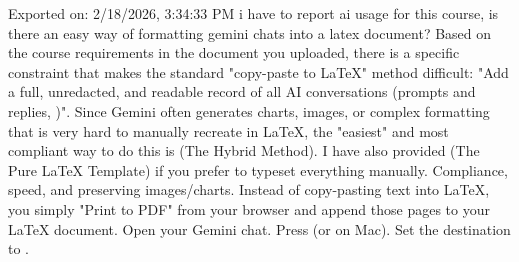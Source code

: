 \markdownRendererDocumentBegin
\markdownRendererSectionBegin
{}\markdownRendererInterblockSeparator
{}\markdownRendererBlockQuoteBegin
Exported on: 2/18/2026, 3:34:33 PM
\markdownRendererBlockQuoteEnd \markdownRendererInterblockSeparator
{}\markdownRendererThematicBreak{}\markdownRendererInterblockSeparator
{}\markdownRendererSectionBegin
{}\markdownRendererInterblockSeparator
{}i have to report ai usage for this course, is there an easy way of formatting gemini chats into a latex document?\markdownRendererInterblockSeparator
{}
\markdownRendererSectionEnd \markdownRendererSectionBegin
{}\markdownRendererInterblockSeparator
{}Based on the course requirements in the  document you uploaded, there is a specific constraint that makes the standard "copy-paste to LaTeX" method difficult:\markdownRendererInterblockSeparator
{}\markdownRendererBlockQuoteBegin
"Add a full, unredacted, and readable record of all AI conversations (prompts and replies, )\markdownRendererEllipsis{}".
\markdownRendererBlockQuoteEnd \markdownRendererInterblockSeparator
{}Since Gemini often generates charts, images, or complex formatting that is very hard to manually recreate in LaTeX, the "easiest" and most compliant way to do this is  (The Hybrid Method). I have also provided  (The Pure LaTeX Template) if you prefer to typeset everything manually.\markdownRendererInterblockSeparator
{}\markdownRendererSectionBegin
{}\markdownRendererInterblockSeparator
{} Compliance, speed, and preserving images/charts. Instead of copy-pasting text into LaTeX, you simply "Print to PDF" from your browser and append those pages to your LaTeX document.\markdownRendererInterblockSeparator
{}\markdownRendererInterblockSeparator
{}\markdownRendererOlBegin
{}Open your Gemini chat.\markdownRendererOlItemEnd 
{}Press  (or  on Mac).\markdownRendererOlItemEnd 
{}Set the destination to .\markdownRendererOlItemEnd 
